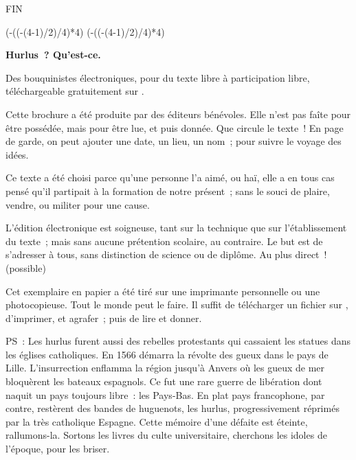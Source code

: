 \documentclass[french,twoside]{book} %
\def\truncdiv#1#2{((#1-(#2-1)/2)/#2)}
\def\moduloop#1#2{(#1-\truncdiv{#1}{#2}*#2)}
\def\modulo#1#2{\number\numexpr\moduloop{#1}{#2}\relax}
\begin{document}
\begin{raggedleft}FIN\end{raggedleft}
 


\ifbooklet
  \pagestyle{empty}
  \clearpage
  \ifnum\modulo{\value{page}}{4}=0 \hbox{}\newpage\hbox{}\newpage\fi
  \ifnum\modulo{\value{page}}{4}=1 \hbox{}\newpage\hbox{}\newpage\fi


  \hbox{}\newpage
  \ifodd\value{page}\hbox{}\newpage\fi
  {\centering\color{rubric}\bfseries\noindent\large
    Hurlus ? Qu’est-ce.\par
    \bigskip
  }
  \noindent Des bouquinistes électroniques, pour du texte libre à participation libre,
  téléchargeable gratuitement sur \href{https://hurlus.fr}{}.\par
  \bigskip
  \noindent Cette brochure a été produite par des éditeurs bénévoles.
  Elle n’est pas faîte pour être possédée, mais pour être lue, et puis donnée.
  Que circule le texte !
  En page de garde, on peut ajouter une date, un lieu, un nom ; pour suivre le voyage des idées.
  \par

  Ce texte a été choisi parce qu’une personne l’a aimé,
  ou haï, elle a en tous cas pensé qu’il partipait à la formation de notre présent ;
  sans le souci de plaire, vendre, ou militer pour une cause.
  \par

  L’édition électronique est soigneuse, tant sur la technique
  que sur l’établissement du texte ; mais sans aucune prétention scolaire, au contraire.
  Le but est de s’adresser à tous, sans distinction de science ou de diplôme.
  Au plus direct ! (possible)
  \par

  Cet exemplaire en papier a été tiré sur une imprimante personnelle
   ou une photocopieuse. Tout le monde peut le faire.
  Il suffit de
  télécharger un fichier sur \href{https://hurlus.fr}{},
  d’imprimer, et agrafer ; puis de lire et donner.\par

  \bigskip

  \noindent PS : Les hurlus furent aussi des rebelles protestants qui cassaient les statues dans les églises catholiques. En 1566 démarra la révolte des gueux dans le pays de Lille. L’insurrection enflamma la région jusqu’à Anvers où les gueux de mer bloquèrent les bateaux espagnols.
  Ce fut une rare guerre de libération dont naquit un pays toujours libre : les Pays-Bas.
  En plat pays francophone, par contre, restèrent des bandes de huguenots, les hurlus, progressivement réprimés par la très catholique Espagne.
  Cette mémoire d’une défaite est éteinte, rallumons-la. Sortons les livres du culte universitaire, cherchons les idoles de l’époque, pour les briser.
\fi
\end{document}
